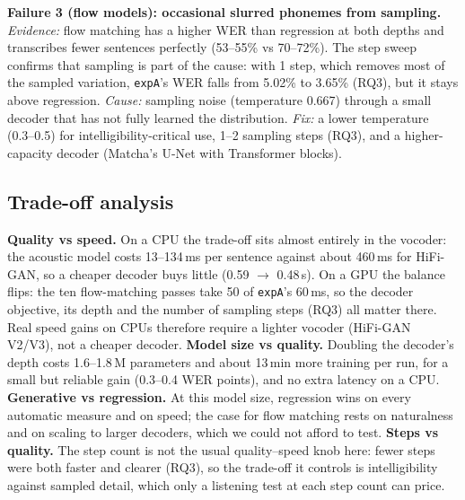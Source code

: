 \documentclass[11pt,a4paper]{article}
\newcommand{\expA}{\texttt{expA}}
\begin{document}
\noindent\textbf{Failure 3 (flow models): occasional slurred phonemes from sampling.} \emph{Evidence:} flow matching has a higher WER than regression at both depths and transcribes fewer sentences perfectly (53--55\% vs 70--72\%). The step sweep confirms that sampling is part of the cause: with 1 step, which removes most of the sampled variation, \expA's WER falls from 5.02\% to 3.65\% (RQ3), but it stays above regression. \emph{Cause:} sampling noise (temperature 0.667) through a small decoder that has not fully learned the distribution. \emph{Fix:} a lower temperature (0.3--0.5) for intelligibility-critical use, 1--2 sampling steps (RQ3), and a higher-capacity decoder (Matcha's U-Net with Transformer blocks).

\subsection{Trade-off analysis}
\textbf{Quality vs speed.} On a CPU the trade-off sits almost entirely in the vocoder: the acoustic model costs 13--134\,ms per sentence against about 460\,ms for HiFi-GAN, so a cheaper decoder buys little (0.59 $\rightarrow$ 0.48\,s). On a GPU the balance flips: the ten flow-matching passes take 50 of \expA's 60\,ms, so the decoder objective, its depth and the number of sampling steps (RQ3) all matter there. Real speed gains on CPUs therefore require a lighter vocoder (HiFi-GAN V2/V3), not a cheaper decoder. \textbf{Model size vs quality.} Doubling the decoder's depth costs 1.6--1.8\,M parameters and about 13\,min more training per run, for a small but reliable gain (0.3--0.4 WER points), and no extra latency on a CPU. \textbf{Generative vs regression.} At this model size, regression wins on every automatic measure and on speed; the case for flow matching rests on naturalness and on scaling to larger decoders, which we could not afford to test. \textbf{Steps vs quality.} The step count is not the usual quality--speed knob here: fewer steps were both faster and clearer (RQ3), so the trade-off it controls is intelligibility against sampled detail, which only a listening test at each step count can price.

\end{document}
